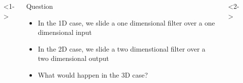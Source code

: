 \begin{frame}
	\begin{columns}
		<1->
		\begin{overlayarea}{\textwidth}{\textheight}
			\small{
				\begin{block}{Question}
					\begin{itemize}
						\justifying
						\item<1-> In the 1D case, we slide a one dimensional filter over a one dimensional input
						\item<7-> In the 2D case, we slide a two dimenstional filter over a two dimensional output
						\item<14-> What would happen in the 3D case?
					\end{itemize}
				\end{block}
			}
		\end{overlayarea}
		        
		<2->
		\begin{overlayarea}{\textwidth}{\textheight}
			        
			        
			\begin{minipage}[t]{0.25\textwidth}
			\end{minipage}
		\end{overlayarea}
	\end{columns}
\end{frame}


